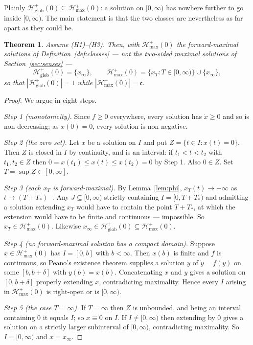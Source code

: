 \documentclass[12pt]{article}
\theoremstyle{plain}
\newtheorem{theorem}{Theorem}
\theoremstyle{definition}
\theoremstyle{remark}
\newcommand{\cont}{\mathfrak{c}}
\newcommand{\Hglob}{\mathcal{H}^{+}_{\mathrm{glob}}}
\newcommand{\Hmax}{\mathcal{H}^{+}_{\max}}
\begin{document}
Plainly $\Hglob(0)\subseteq\Hmax(0)$: a solution on $[0,\infty)$ has nowhere
further to go inside $[0,\infty)$. The main statement is that the two classes
are nevertheless as far apart as they could be.

\begin{theorem}\label{thm:counts}
Assume \textup{(H1)--(H3)}. Then, with $\Hmax(0)$ the \emph{forward}-maximal
solutions of Definition~\ref{def:classes} --- not the two-sided maximal
solutions of Section~\ref{sec:senses} ---
\[
  \Hglob(0)=\{x_{\infty}\},
  \qquad
  \Hmax(0)=\{x_{T}: T\in[0,\infty)\}\cup\{x_{\infty}\},
\]
so that $|\Hglob(0)|=1$ while $|\Hmax(0)|=\cont$.
\end{theorem}

\begin{proof}
We argue in eight steps.

\smallskip
\emph{Step 1 (monotonicity).} Since $f\ge0$ everywhere, every solution has
$\dot x\ge0$ and so is non-decreasing; as $x(0)=0$, every solution is
non-negative.

\smallskip
\emph{Step 2 (the zero set).} Let $x$ be a solution on $I$ and put
$Z=\{t\in I: x(t)=0\}$. Then $Z$ is closed in $I$ by continuity, and is an
interval: if $t_{1}<t<t_{2}$ with $t_{1},t_{2}\in Z$ then
$0=x(t_{1})\le x(t)\le x(t_{2})=0$ by Step 1. Also $0\in Z$. Set
$T=\sup Z\in[0,\infty]$.

\smallskip
\emph{Step 3 (each $x_{T}$ is forward-maximal).} By Lemma~\ref{lem:phi},
$x_{T}(t)\to+\infty$ as $t\to(T+T_{*})^{-}$. Any $J\subseteq[0,\infty)$ strictly
containing $I=[0,T+T_{*})$ and admitting a solution extending $x_{T}$ would have
to contain the point $T+T_{*}$, at which the extension would have to be finite
and continuous --- impossible. So $x_{T}\in\Hmax(0)$. Likewise
$x_{\infty}\in\Hglob(0)\subseteq\Hmax(0)$.

\smallskip
\emph{Step 4 (no forward-maximal solution has a compact domain).} Suppose
$x\in\Hmax(0)$ has $I=[0,b]$ with $b<\infty$. Then $x(b)$ is finite and $f$ is
continuous, so Peano's existence theorem supplies a solution $y$ of
$\dot y=f(y)$ on some $[b,b+\delta]$ with $y(b)=x(b)$. Concatenating $x$ and $y$
gives a solution on $[0,b+\delta]$ properly extending $x$, contradicting
maximality. Hence every $I$ arising in $\Hmax(0)$ is right-open or is
$[0,\infty)$.

\smallskip
\emph{Step 5 (the case $T=\infty$).} If $T=\infty$ then $Z$ is unbounded, and
being an interval containing $0$ it equals $I$; so $x\equiv0$ on $I$. If
$I\ne[0,\infty)$ then extending by $0$ gives a solution on a strictly larger
subinterval of $[0,\infty)$, contradicting maximality. So $I=[0,\infty)$ and
$x=x_{\infty}$.


\end{proof}
\end{document}
